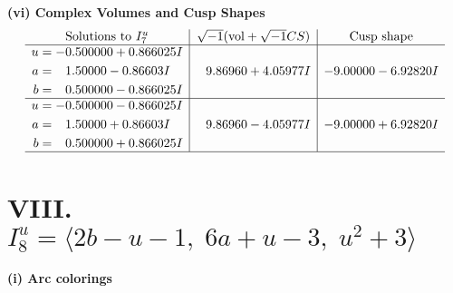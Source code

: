 \documentclass[1p]{elsarticle_modified}
\theoremstyle{definition}
\newcommand{\I}{\sqrt{-1}}
\begin{document}
\newpage\flushleft \textbf{(vi) Complex Volumes and Cusp Shapes}
$$\begin{array}{c|c|c}  
\text{Solutions to }I^u_{7}& \I (\text{vol} + \sqrt{-1}CS) & \text{Cusp shape}\\
 \hline 
\begin{aligned}
u &= -0.500000 + 0.866025 I \\
a &= \phantom{-}1.50000 - 0.86603 I \\
b &= \phantom{-}0.500000 - 0.866025 I\end{aligned}
 & \phantom{-}9.86960 + 4.05977 I & -9.00000 - 6.92820 I \\ \hline\begin{aligned}
u &= -0.500000 - 0.866025 I \\
a &= \phantom{-}1.50000 + 0.86603 I \\
b &= \phantom{-}0.500000 + 0.866025 I\end{aligned}
 & \phantom{-}9.86960 - 4.05977 I & -9.00000 + 6.92820 I\\
 \hline 
 \end{array}$$\newpage\newpage\renewcommand{\arraystretch}{1}
\centering \section*{VIII. $I^u_{8}= \langle 2 b- u-1,\;6 a+u-3,\;u^2+3 \rangle$}
\flushleft \textbf{(i) Arc colorings}\\
\end{document}
